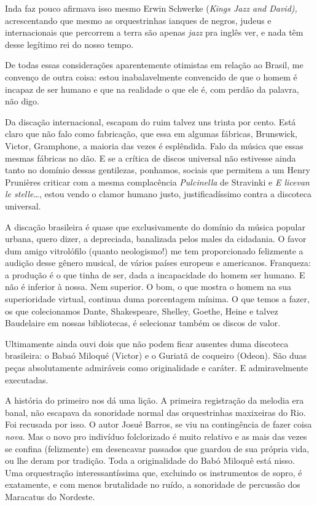 Inda faz pouco afirmava isso mesmo Erwin Schwerke (\emph{Kings Jazz and
David),} acrescentando que mesmo as orquestrinhas ianques de negros,
judeus e internacionais que percorrem a terra são apenas \emph{jazz} pra
inglês ver, e nada têm desse legítimo rei do nosso tempo.

De todas essas considerações aparentemente otimistas em relação ao
Brasil, me convenço de outra coisa: estou inabalavelmente convencido de
que o homem é incapaz de ser humano e que na realidade o que ele é, com
perdão da palavra, não digo.

Da discação internacional, escapam do ruim talvez uns trinta por cento.
Está claro que não falo como fabricação, que essa em algumas fábricas,
Brunswick, Victor, Gramphone, a maioria das vezes é esplêndida. Falo da
música que essas mesmas fábricas no dão. E se a crítica de discos
universal não estivesse ainda tanto no domínio dessas gentilezas,
ponhamos, sociais que permitem a um Henry Prunières criticar com a mesma
complacência \textit{Pulcinella} de Stravinki e \textit{E licevan le stelle}\ldots{}, estou
vendo o clamor humano justo, justificadíssimo contra a discoteca
universal.

A discação brasileira é quase que exclusivamente do domínio da música
popular urbana, quero dizer, a depreciada, banalizada pelos males da
cidadania. O favor dum amigo vitrolófilo (quanto neologismo!) me tem
proporcionado felizmente a audição desse gênero musical, de vários
países europeus e americanos. Franqueza: a produção é o que tinha de
ser, dada a incapacidade do homem ser humano. E não é inferior à nossa.
Nem superior. O bom, o que mostra o homem na sua superioridade virtual,
continua duma porcentagem mínima. O que temos a fazer, os que
colecionamos Dante, Shakespeare, Shelley, Goethe, Heine e talvez
Baudelaire em nossas bibliotecas, é selecionar também os discos de
valor.

Ultimamente ainda ouvi dois que não podem ficar ausentes duma discoteca
brasileira: o Babaó Miloqué (Victor) e o Guriatã de coqueiro (Odeon).
São duas peças absolutamente admiráveis como originalidade e caráter. E
admiravelmente executadas.

A história do primeiro nos dá uma lição. A primeira registração da
melodia era banal, não escapava da sonoridade normal das orquestrinhas
maxixeiras do Rio. Foi recusada por isso. O autor Josué Barros, se viu
na contingência de fazer coisa \textit{nova}. Mas o novo pro indivíduo
folclorizado é muito relativo e as mais das vezes se confina
(felizmente) em desencavar passados que guardou de sua própria vida, ou
lhe deram por tradição. Toda a originalidade do Babó Miloquê está nisso.
Uma orquestração interessantíssima que, excluindo os instrumentos de
sopro, é exatamente, e com menos brutalidade no ruído, a sonoridade de
percussão dos Maracatus do Nordeste.

